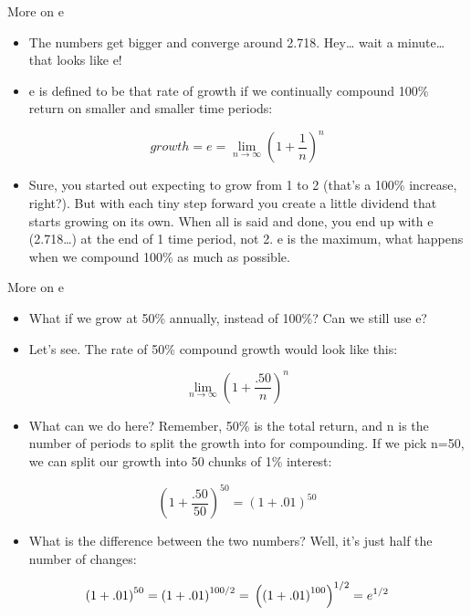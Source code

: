 \documentclass[
  ignorenonframetext,
]{beamer}
\providecommand{\tightlist}{%
  \setlength{\itemsep}{0pt}\setlength{\parskip}{0pt}}
\begin{document}
\begin{frame}{More on e}
\protect\hypertarget{more-on-e-5}{}

\begin{itemize}
\item
  The numbers get bigger and converge around 2.718. Hey\ldots{} wait a
  minute\ldots{} that looks like e!
\item
  e is defined to be that rate of growth if we continually compound
  100\% return on smaller and smaller time periods:
\end{itemize}

\[\displaystyle{growth = e = \lim_{n\to\infty} \left( 1 + \frac{1}{n} \right)^n}\]

\begin{itemize}
\tightlist
\item
  Sure, you started out expecting to grow from 1 to 2 (that's a 100\%
  increase, right?). But with each tiny step forward you create a little
  dividend that starts growing on its own. When all is said and done,
  you end up with e (2.718\ldots) at the end of 1 time period, not 2. e
  is the maximum, what happens when we compound 100\% as much as
  possible.
\end{itemize}

\end{frame}

\begin{frame}{More on e}
\protect\hypertarget{more-on-e-6}{}

\begin{itemize}
\item
  What if we grow at 50\% annually, instead of 100\%? Can we still use
  e?
\item
  Let's see. The rate of 50\% compound growth would look like this:
\end{itemize}

\[\displaystyle{\lim_{n\to\infty} \left( 1 + \frac{.50}{n} \right)^n}\]

\begin{itemize}
\tightlist
\item
  What can we do here? Remember, 50\% is the total return, and n is the
  number of periods to split the growth into for compounding. If we pick
  n=50, we can split our growth into 50 chunks of 1\% interest:
\end{itemize}

\[\displaystyle{\left( 1 + \frac{.50}{50} \right)^{50} = \left( 1 + .01 \right)^{50}}\]

\begin{itemize}
\tightlist
\item
  What is the difference between the two numbers? Well, it's just half
  the number of changes:
\end{itemize}

\[\displaystyle{\left( 1 + .01 \right)^{50} = \left( 1 + .01 \right)^{100/2} = \\ \left( \left( 1 + .01 \right)^{100}\right)^{1/2} = e^{1/2} }\]

\end{frame}
\end{document}
